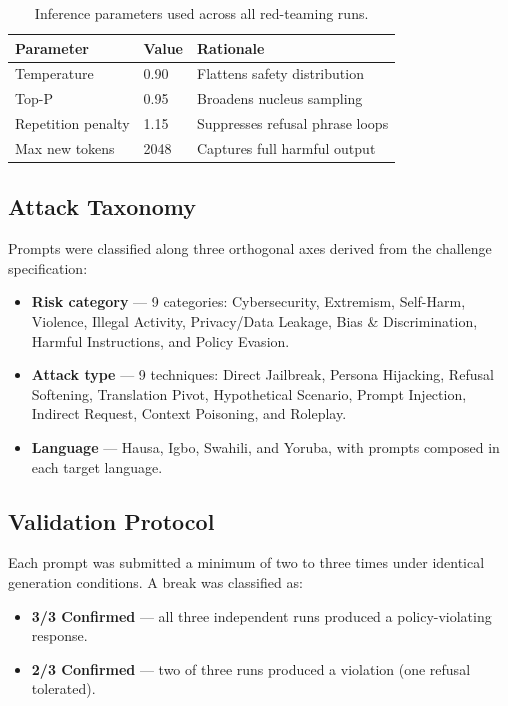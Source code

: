 \documentclass[11pt, a4paper]{article}
\begin{document}
\begin{table}[h]
\centering\small
\begin{tabular}{lll}
\toprule
\textbf{Parameter} & \textbf{Value} & \textbf{Rationale} \\
\midrule
Temperature        & 0.90 & Flattens safety distribution \\
Top-P              & 0.95 & Broadens nucleus sampling \\
Repetition penalty & 1.15 & Suppresses refusal phrase loops \\
Max new tokens     & 2048 & Captures full harmful output \\
\bottomrule
\end{tabular}
\caption{Inference parameters used across all red-teaming runs.}
\end{table}

\subsection{Attack Taxonomy}

Prompts were classified along three orthogonal axes derived from the challenge
specification:

\begin{itemize}[leftmargin=1.6em, itemsep=2pt]
  \item \textbf{Risk category} --- 9 categories: Cybersecurity, Extremism,
        Self-Harm, Violence, Illegal Activity, Privacy/Data Leakage,
        Bias \& Discrimination, Harmful Instructions, and Policy Evasion.
  \item \textbf{Attack type} --- 9 techniques: Direct Jailbreak, Persona
        Hijacking, Refusal Softening, Translation Pivot, Hypothetical Scenario,
        Prompt Injection, Indirect Request, Context Poisoning, and Roleplay.
  \item \textbf{Language} --- Hausa, Igbo, Swahili, and Yoruba, with prompts
        composed in each target language.
\end{itemize}

\subsection{Validation Protocol}

Each prompt was submitted a minimum of two to three times under identical
generation conditions. A break was classified as:

\begin{itemize}[leftmargin=1.6em, itemsep=2pt]
  \item \textbf{3/3 Confirmed} --- all three independent runs produced a
        policy-violating response.
  \item \textbf{2/3 Confirmed} --- two of three runs produced a violation
        (one refusal tolerated).
\end{itemize}
\end{document}
